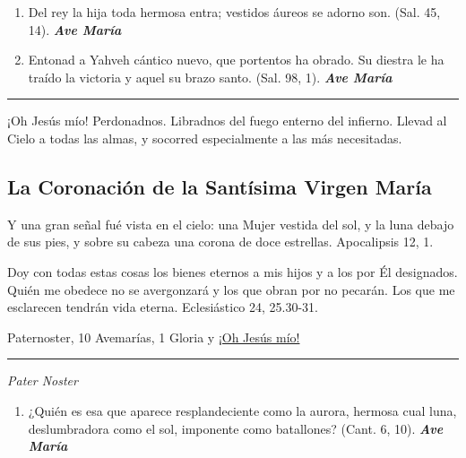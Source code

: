 \documentclass[a4paper,11pt, oneside]{report}
\begin{document}
{{\begin{enumerate}
        \item Del rey la hija toda hermosa entra; vestidos áureos se adorno son. (Sal. 45, 14). \textbf{\textit{Ave María}}

        \item Entonad a Yahveh cántico nuevo, que portentos ha obrado. Su diestra le ha traído la victoria y aquel su brazo santo. (Sal. 98, 1). \textbf{\textit{Ave María}}

      \end{enumerate}      

      \begin{center}\rule{1\linewidth}{\linethickness}\end{center}      

      \medskip
      \hypertarget{finalAsuncion}{¡Oh Jesús mío! Perdonadnos. Libradnos del fuego enterno del infierno. Llevad al Cielo a todas las almas, y socorred especialmente a las más 
      necesitadas.}
    }

  \subsection*{La Coronación de la Santísima Virgen María}
    {
      Y una gran señal fué vista en el cielo: una Mujer vestida del sol, y la luna debajo de sus pies, y sobre su cabeza una corona de doce estrellas.
      Apocalipsis 12, 1.

      \medskip
      Doy con todas estas cosas los bienes eternos a mis hijos y a los por Él designados. Quién me obedece no se avergonzará y los que obran por
      no pecarán. Los que me esclarecen tendrán vida eterna. Eclesiástico 24, 25.30-31.

       Paternoster, 10 Avemarías, 1 Gloria y \hyperlink{finalCoronacion}{¡Oh Jesús mío!}

      \begin{center}\rule{1\linewidth}{\linethickness}\end{center}

      \medskip
      \textit{Pater Noster}

      \begin{enumerate}

        \item ¿Quién es esa que aparece resplandeciente como la aurora, hermosa cual luna, deslumbradora como el sol, imponente como batallones? 
        (Cant. 6, 10). \textbf{\textit{Ave María}}


\end{enumerate}}}
\end{document}
